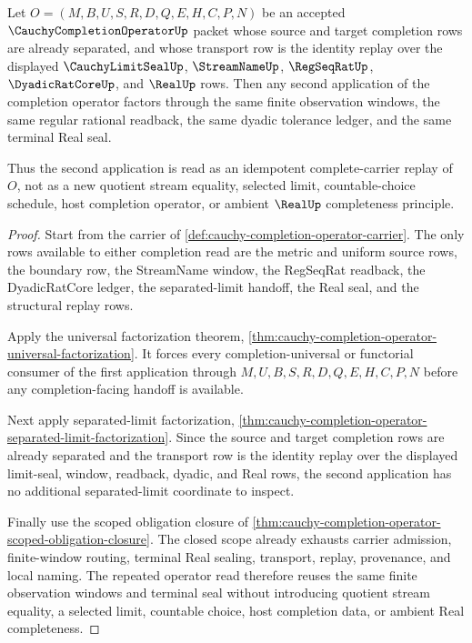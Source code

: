 \begin{theorem}
\label{thm:cauchy-completion-operator-idempotent-complete-carrier}
Let $O=(M,B,U,S,R,D,Q,E,H,C,P,N)$ be an accepted $\CauchyCompletionOperatorUp$ packet whose source and target completion rows are already separated, and whose transport row is the identity replay over the displayed $\CauchyLimitSealUp$, $\StreamNameUp$, $\RegSeqRatUp$, $\DyadicRatCoreUp$, and $\RealUp$ rows. Then any second application of the completion operator factors through the same finite observation windows, the same regular rational readback, the same dyadic tolerance ledger, and the same terminal Real seal.

Thus the second application is read as an idempotent complete-carrier replay of $O$, not as a new quotient stream equality, selected limit, countable-choice schedule, host completion operator, or ambient $\RealUp$ completeness principle.
\end{theorem}
\begin{proof}
Start from the carrier of \autoref{def:cauchy-completion-operator-carrier}. The only rows available to either completion read are the metric and uniform source rows, the boundary row, the StreamName window, the RegSeqRat readback, the DyadicRatCore ledger, the separated-limit handoff, the Real seal, and the structural replay rows.

Apply the universal factorization theorem, \autoref{thm:cauchy-completion-operator-universal-factorization}. It forces every completion-universal or functorial consumer of the first application through $M,U,B,S,R,D,Q,E,H,C,P,N$ before any completion-facing handoff is available.

Next apply separated-limit factorization, \autoref{thm:cauchy-completion-operator-separated-limit-factorization}. Since the source and target completion rows are already separated and the transport row is the identity replay over the displayed limit-seal, window, readback, dyadic, and Real rows, the second application has no additional separated-limit coordinate to inspect.

Finally use the scoped obligation closure of \autoref{thm:cauchy-completion-operator-scoped-obligation-closure}. The closed scope already exhausts carrier admission, finite-window routing, terminal Real sealing, transport, replay, provenance, and local naming. The repeated operator read therefore reuses the same finite observation windows and terminal seal without introducing quotient stream equality, a selected limit, countable choice, host completion data, or ambient Real completeness.
\end{proof}

